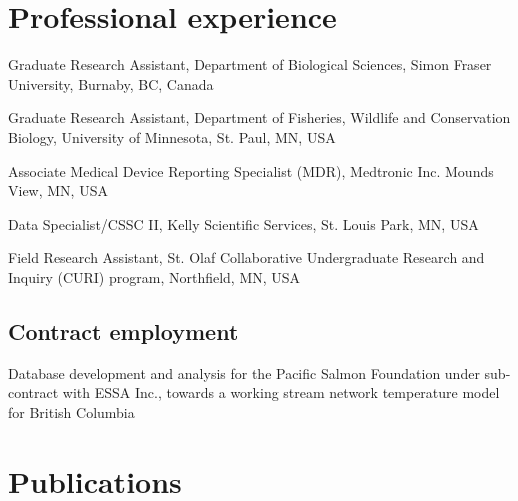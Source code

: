 \section{Professional experience}

\begin{description}
\tightlist

\item[2013--19] Graduate Research Assistant, Department of Biological Sciences, Simon Fraser University, Burnaby, BC, Canada
\item[2011--13] Graduate Research Assistant, Department of Fisheries, Wildlife and Conservation Biology, University of Minnesota, St. Paul, MN, USA
\item[2011] Associate Medical Device Reporting Specialist (MDR), Medtronic Inc. Mounds View, MN, USA
\item[2009--10] Data Specialist/CSSC II, Kelly Scientific Services, St. Louis Park, MN, USA
\item[2008-09] Field Research Assistant, St. Olaf Collaborative Undergraduate Research and Inquiry (CURI) program, Northfield, MN, USA

\subsection{Contract employment}

\item[2016] Database development and analysis for the Pacific Salmon Foundation under sub-contract with ESSA Inc., towards a working stream network temperature model for British Columbia

\end{description}



\section{Publications}

